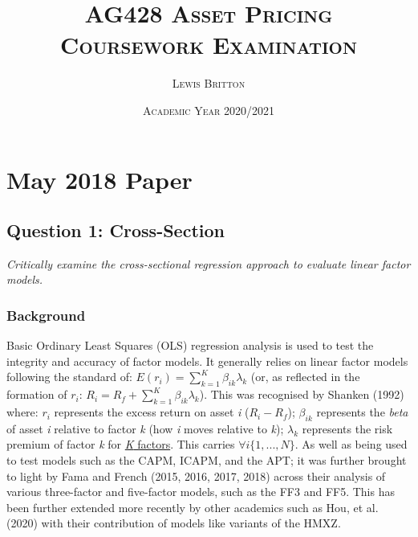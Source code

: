 \documentclass[11pt, english]{article}
\begin{document}

	\title{\textsc{AG428 Asset Pricing\\ Coursework Examination}}
        \author{\textsc{Lewis Britton}}
        \date{\textsc{Academic Year 2020/2021}}
	\maketitle

\newpage


        \renewcommand{\contentsname}{Table of Contents}

        \tableofcontents

\newpage


\section{May 2018 Paper}

	\subsection{Question 1: Cross-Section}
        
	\textit{Critically examine the cross-sectional regression approach to evaluate linear factor models.}

		\subsubsection*{Background}

	Basic Ordinary Least Squares (OLS) regression analysis is used to test the integrity and accuracy of factor models. It generally relies on linear factor models following the standard of: $E(r_i)=\sum_{k=1}^K\beta_{ik}\lambda_{k}$ (or, as reflected in the formation of $r_i$: $R_i=R_f+\sum_{k=1}^K\beta_{ik}\lambda_{k}$). This was recognised by Shanken (1992) where: $r_i$ represents the excess return on asset \textit{i} ($R_i-R_f$); $\beta_{ik}$ represents the \textit{beta} of asset \textit{i} relative to factor \textit{k} (how \textit{i} moves relative to \textit{k}); $\lambda_k$ represents the risk premium of factor \textit{k} for \href{https://www.tennis-warehouse.com/reviews/K61T90/K61T90review.html}{\textit{K} factors}. This carries $\forall i\{1,...,N\}$. As well as being used to test models such as the CAPM, ICAPM, and the APT; it was further brought to light by Fama and French (2015, 2016, 2017, 2018) across their analysis of various three-factor and five-factor models, such as the FF3 and FF5. This has been further extended more recently by other academics such as Hou, et al. (2020) with their contribution of models like variants of the HMXZ.\\
\end{document}
